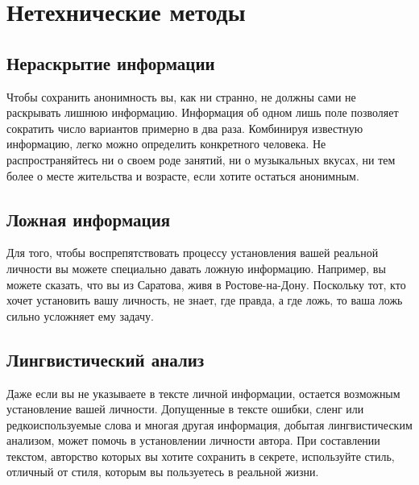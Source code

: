 \chapter{Нетехнические методы}
\section{Нераскрытие информации}
Чтобы сохранить анонимность вы, как ни странно, не должны сами не раскрывать лишнюю информацию. Информация об одном лишь поле позволяет сократить число вариантов примерно в два раза. Комбинируя известную информацию, легко можно определить конкретного человека. Не распространяйтесь ни о своем роде занятий, ни о музыкальных вкусах, ни тем более о месте жительства и возрасте, если хотите остаться анонимным.
\section{Ложная информация}
Для того, чтобы воспрепятствовать процессу установления вашей реальной личности вы можете специально давать ложную информацию. Например, вы можете сказать, что вы из Саратова, живя в Ростове-на-Дону. Поскольку тот, кто хочет установить вашу личность, не знает, где правда, а где ложь, то ваша ложь сильно усложняет ему задачу.
\section{Лингвистический анализ}
Даже если вы не указываете в тексте личной информации, остается возможным установление вашей личности. Допущенные в тексте ошибки, сленг или редкоиспользуемые слова и многая другая информация, добытая лингвистическим анализом, может помочь в установлении личности автора. При составлении текстом, авторство которых вы хотите сохранить в секрете, используйте стиль, отличный от стиля, которым вы пользуетесь в реальной жизни.

